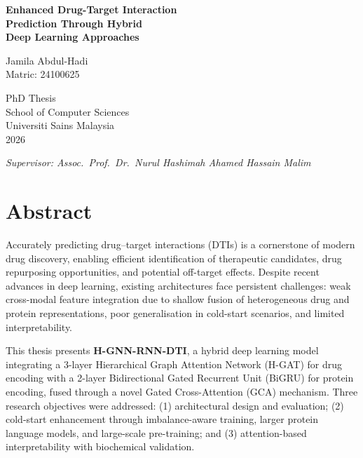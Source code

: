 \documentclass[12pt,a4paper,oneside]{report}
\begin{document}
\begin{titlepage}
\centering
\vspace*{3cm}
{\Huge\bfseries\color{navy} Enhanced Drug-Target Interaction\\[0.5em]
Prediction Through Hybrid\\[0.5em]
Deep Learning Approaches\par}
\vspace{2cm}
{\Large Jamila Abdul-Hadi\\[0.3em]
\normalsize Matric: 24100625\par}
\vspace{2cm}
{\large PhD Thesis\\[0.3em]
School of Computer Sciences\\[0.3em]
Universiti Sains Malaysia\\[0.3em]
2026\par}
\vspace{1.5cm}
{\normalsize\itshape Supervisor: Assoc.\ Prof.\ Dr.\ Nurul Hashimah Ahamed Hassain Malim\par}
\end{titlepage}

\chapter*{Abstract}

Accurately predicting drug--target interactions (DTIs) is a cornerstone of modern drug discovery, enabling efficient identification of therapeutic candidates, drug repurposing opportunities, and potential off-target effects. Despite recent advances in deep learning, existing architectures face persistent challenges: weak cross-modal feature integration due to shallow fusion of heterogeneous drug and protein representations, poor generalisation in cold-start scenarios, and limited interpretability.

This thesis presents \textbf{H-GNN-RNN-DTI}, a hybrid deep learning model integrating a 3-layer Hierarchical Graph Attention Network (H-GAT) for drug encoding with a 2-layer Bidirectional Gated Recurrent Unit (BiGRU) for protein encoding, fused through a novel Gated Cross-Attention (GCA) mechanism. Three research objectives were addressed: (1) architectural design and evaluation; (2) cold-start enhancement through imbalance-aware training, larger protein language models, and large-scale pre-training; and (3) attention-based interpretability with biochemical validation.
\end{document}
